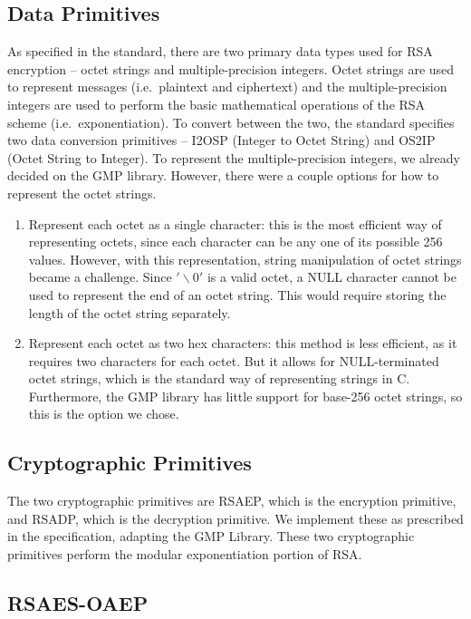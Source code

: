 \documentclass[letterpaper]{article}
\begin{document}
\subsection{Data Primitives}
As specified in the standard, there are two primary data types used for RSA encryption – octet strings and multiple-precision integers. Octet strings are used to represent messages (i.e.\ plaintext and ciphertext) and the multiple-precision integers are used to perform the basic mathematical operations of the RSA scheme (i.e.\ exponentiation). To convert between the two, the standard specifies two data conversion primitives – I2OSP (Integer to Octet String) and OS2IP (Octet String to Integer). To represent the multiple-precision integers, we already decided on the GMP library. However, there were a couple options for how to represent the octet strings.

\begin{enumerate}
    \item Represent each octet as a single character: this is the most efficient way of representing octets, since each character can be any one of its possible 256 values. However, with this representation, string manipulation of octet strings became a challenge. Since {\tt $'\backslash0'$} is a valid octet, a NULL character cannot be used to represent the end of an octet string. This would require storing the length of the octet string separately. 

    \item Represent each octet as two hex characters: this method is less efficient, as it requires two characters for each octet. But it allows for NULL-terminated octet strings, which is the standard way of representing strings in C. Furthermore, the GMP library has little support for base-256 octet strings, so this is the option we chose.
\end{enumerate}

\subsection{Cryptographic Primitives}

The two cryptographic primitives are RSAEP, which is the encryption primitive, and RSADP, which is the decryption primitive. We implement these as prescribed in the specification, adapting the GMP Library. These two cryptographic primitives perform the modular exponentiation portion of RSA.

\subsection{RSAES-OAEP}
\end{document}

